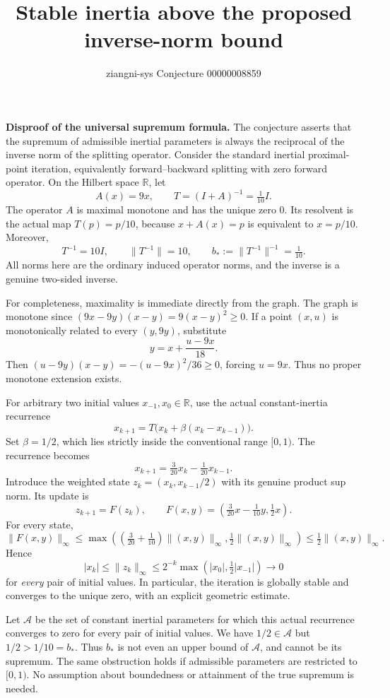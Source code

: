\documentclass[11pt]{article}
\title{Stable inertia above the proposed inverse-norm bound}
\author{ziangni-sys \quad Conjecture 00000008859}
\date{}
\begin{document}
\maketitle
\vspace{-2em}
\textbf{Disproof of the universal supremum formula.} The conjecture asserts that the supremum of admissible inertial parameters is always the reciprocal of the inverse norm of the splitting operator. Consider the standard inertial proximal-point iteration, equivalently forward--backward splitting with zero forward operator. On the Hilbert space $\mathbb R$, let
\[
 A(x)=9x,\qquad T=(I+A)^{-1}=\tfrac1{10}I.
\]
The operator $A$ is maximal monotone and has the unique zero $0$. Its resolvent is the actual map $T(p)=p/10$, because $x+A(x)=p$ is equivalent to $x=p/10$. Moreover,
\[
 T^{-1}=10I,\qquad \|T^{-1}\|=10,\qquad b_*:=\|T^{-1}\|^{-1}=\tfrac1{10}.
\]
All norms here are the ordinary induced operator norms, and the inverse is a genuine two-sided inverse.

For completeness, maximality is immediate directly from the graph. The graph is monotone since
$(9x-9y)(x-y)=9(x-y)^2\ge0$. If a point $(x,u)$ is monotonically related to every $(y,9y)$, substitute
\[
 y=x+\frac{u-9x}{18}.
\]
Then $(u-9y)(x-y)=-(u-9x)^2/36\ge0$, forcing $u=9x$. Thus no proper monotone extension exists.

For arbitrary two initial values $x_{-1},x_0\in\mathbb R$, use the actual constant-inertia recurrence
\[
 x_{k+1}=T\bigl(x_k+\beta(x_k-x_{k-1})\bigr).
\]
Set $\beta=1/2$, which lies strictly inside the conventional range $[0,1)$. The recurrence becomes
\[
 x_{k+1}=\tfrac3{20}x_k-\tfrac1{20}x_{k-1}.
\]
Introduce the weighted state $z_k=(x_k,x_{k-1}/2)$ with its genuine product sup norm. Its update is
\[
 z_{k+1}=F(z_k),\qquad F(x,y)=\left(\tfrac3{20}x-\tfrac1{10}y,\tfrac12x\right).
\]
For every state,
\[
 \|F(x,y)\|_\infty
 \le\max\left(\left(\tfrac3{20}+\tfrac1{10}\right)\|(x,y)\|_\infty,
                    \tfrac12\|(x,y)\|_\infty\right)
 \le\tfrac12\|(x,y)\|_\infty.
\]
Hence
\[
 |x_k|\le\|z_k\|_\infty\le2^{-k}\max\left(|x_0|,\tfrac12|x_{-1}|\right)\longrightarrow0
\]
for \emph{every} pair of initial values. In particular, the iteration is globally stable and converges to the unique zero, with an explicit geometric estimate.

Let $\mathcal A$ be the set of constant inertial parameters for which this actual recurrence converges to zero for every pair of initial values. We have $1/2\in\mathcal A$ but $1/2>1/10=b_*$. Thus $b_*$ is not even an upper bound of $\mathcal A$, and cannot be its supremum. The same obstruction holds if admissible parameters are restricted to $[0,1)$. No assumption about boundedness or attainment of the true supremum is needed.
\end{document}
